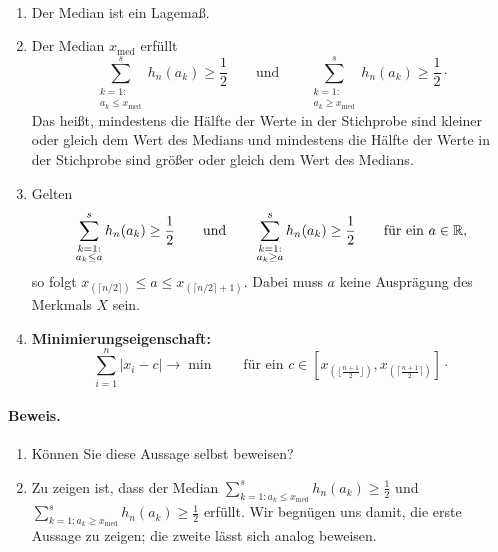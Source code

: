 \begin{satz}
    \label{satz:median_eigenschaften}  \\
    \begin{enumerate}[label=(\alph*)]
        \item Der Median ist ein \gls{Lagemaß}.
        \item Der Median $x_{\mathrm{med}}$ erfüllt
        \[
            \sum_{\substack{k=1:\\ a_k\leq x_{\mathrm{med}}}}^s h_n(a_k) \geq \frac12
            \qquad\text{und}\qquad
            \sum_{\substack{k=1:\\ a_k\geq x_{\mathrm{med}}}}^s h_n(a_k) \geq \frac12 \cdot
        \]
        Das heißt, mindestens die Hälfte der Werte in der Stichprobe sind kleiner oder gleich dem Wert des Medians und mindestens die Hälfte der Werte in der Stichprobe sind größer oder gleich dem Wert des Medians.
        \item Gelten
        \[
            \sum_{\substack{k=1:\\ a_k\leq a}}^s h_n(a_k)\geq\frac12 \qquad\text{und}\qquad \sum_{\substack{k=1:\\ a_k\geq a}}^s h_n(a_k)\geq\frac12 \qquad\text{für ein } a\in\mathbb{R} ,
        \]
        so folgt $x_{(\lceil n/2\rceil)} \leq a \leq x_{(\lceil n/2\rceil+1)}$.
        Dabei muss $a$ keine Ausprägung des \gls{Merkmal}s $X$ sein.
        \item \textbf{Minimierungseigenschaft:} 
        \[
            \sum_{i=1}^n |x_i-c| \to \min \qquad \text{für ein } c\in\left[x_{\left(\lfloor\frac{n+1}2\rfloor\right)}, x_{\left(\lceil\frac{n+1}2\rceil\right)}\right] \cdot
        \]
    \end{enumerate}

    \paragraph{Beweis.}
    \begin{enumerate}[label=(\alph*)]
        \item Können Sie diese Aussage selbst beweisen?
        \item Zu zeigen ist, dass der Median $\sum_{k=1: a_k\leq x_{\mathrm{med}}}^s h_n(a_k)\geq\frac12$ und $\sum_{k=1: a_k\geq x_{\mathrm{med}}}^s h_n(a_k)\geq\frac12$ erfüllt.
        Wir begnügen uns damit, die erste Aussage zu zeigen; die zweite lässt sich analog beweisen.


\end{enumerate}
\end{satz}
